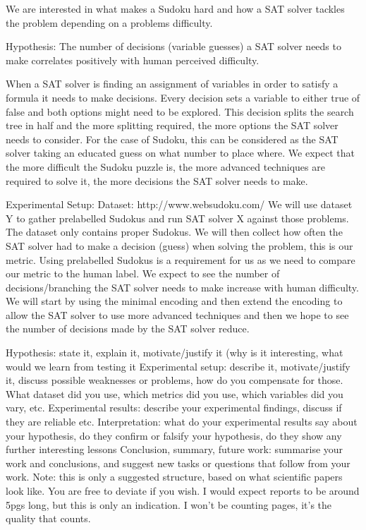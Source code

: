 We are interested in what makes a Sudoku hard and how a SAT solver tackles the problem depending on a problems difficulty.

Hypothesis:
The number of decisions (variable guesses) a SAT solver needs to make correlates positively with human perceived difficulty.

When a SAT solver is finding an assignment of variables in order to satisfy a formula it needs to make decisions. Every decision sets a variable to either true of false and both options might need to be explored. This decision splits the search tree in half and the more splitting required, the more options the SAT solver needs to consider. For the case of Sudoku, this can be considered as the SAT solver taking an educated guess on what number to place where. We expect that the more difficult the Sudoku puzzle is, the more advanced techniques are required to solve it, the more decisions the SAT solver needs to make.

Experimental Setup:
Dataset: http://www.websudoku.com/
We will use dataset Y to gather prelabelled Sudokus and run SAT solver X against those problems. The dataset only contains proper Sudokus. We will then collect how often the SAT solver had to make a decision (guess) when solving the problem, this is our metric. Using prelabelled Sudokus is a requirement for us as we need to compare our metric to the human label. We expect to see the number of decisions/branching the SAT solver needs to make increase with human difficulty.
We will start by using the minimal encoding and then extend the encoding to allow the SAT solver to use more advanced techniques and then we hope to see the number of decisions made by the SAT solver reduce.


Hypothesis: state it, explain it, motivate/justify it (why is it interesting, what would we learn from testing it
Experimental setup: describe it, motivate/justify it, discuss possible weaknesses or problems, how do you compensate for those. What dataset did you use, which metrics did you use, which variables did you vary, etc.
Experimental results: describe your experimental findings, discuss if they are reliable etc.
Interpretation: what do your experimental results say about your hypothesis, do they confirm or falsify your hypothesis, do they show any further interesting lessons
Conclusion, summary, future work: summarise your work and conclusions, and suggest new tasks or questions that follow from your work.
Note: this is only a suggested structure, based on what scientific papers look like. You are free to deviate if you wish. I would expect reports to be around 5pgs long, but this is only an indication. I won’t be counting pages, it’s the quality that counts.

